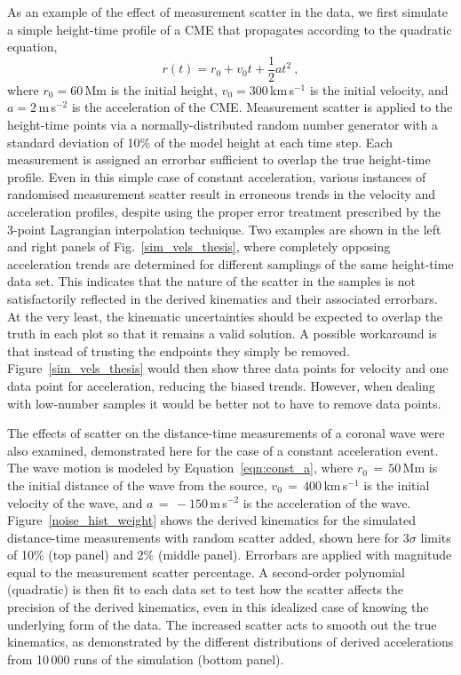 \documentclass[referee]{aa}
\begin{document}
As an example of the effect of measurement scatter in the data, we first simulate a simple height-time profile of a CME that propagates according to the quadratic equation,
\begin{equation}
\label{eqn:const_a}
r(t) = r_0 + v_0 t + \frac{1}{2}a t^2 \ ,
\end{equation}
where $r_0=$60\,Mm is the initial height, $v_0=$300\,km\,s$^{-1}$ is the initial velocity, and $a=$2\,m\,s$^{-2}$ is the acceleration of the CME. Measurement scatter is applied to the height-time points via a normally-distributed random number generator with a standard deviation of 10\% of the model height at each time step. Each measurement is assigned an errorbar sufficient to overlap the true height-time profile. Even in this simple case of constant acceleration, various instances of randomised measurement scatter result in erroneous trends in the velocity and acceleration profiles, despite using the proper error treatment prescribed by the 3-point Lagrangian interpolation technique. Two examples are shown in the left and right panels of Fig.~\ref{sim_vels_thesis}, where completely opposing acceleration trends are determined for different samplings of the same height-time data set. This indicates that the nature of the scatter in the samples is not satisfactorily reflected in the derived kinematics and their associated errorbars. At the very least, the kinematic uncertainties should be expected to overlap the truth in each plot so that it remains a valid solution. A possible workaround is that instead of trusting the endpoints they simply be removed. Figure~\ref{sim_vels_thesis} would then show three data points for velocity and one data point for acceleration, reducing the biased trends. However, when dealing with low-number samples it would be better not to have to remove data points.


The effects of scatter on the distance-time measurements of a coronal wave were also examined, demonstrated here for the case of a constant acceleration event. The wave motion is modeled by Equation~\ref{eqn:const_a}, where $r_0\,=\,50$\,Mm is the initial distance of the wave from the source, $v_0\,=\,400$\,km\,s$^{-1}$ is the initial velocity of the wave, and $a\,=\,-150$\,m\,s$^{-2}$ is the acceleration of the wave. Figure~\ref{noise_hist_weight} shows the derived kinematics for the simulated distance-time measurements with random scatter added, shown here for 3$\sigma$ limits of 10\% (top panel) and 2\% (middle panel). Errorbars are applied with magnitude equal to the measurement scatter percentage. A second-order polynomial (quadratic) is then fit to each data set to test how the scatter affects the precision of the derived kinematics, even in this idealized case of knowing the underlying form of the data. The increased scatter acts to smooth out the true kinematics, as demonstrated by the different distributions of derived accelerations from 10\,000 runs of the simulation (bottom panel).
\end{document}
